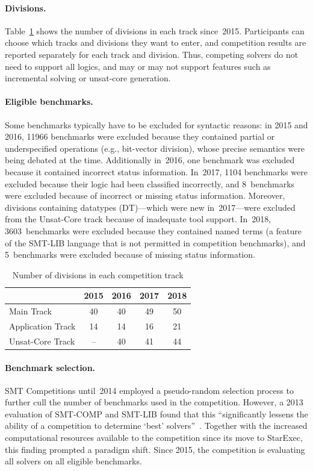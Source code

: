 \documentclass[dvipsnames,table,twoside,11pt]{article}
\newcommand{\maintrack}{Main Track\xspace}
\newcommand{\apptrack}{Application Track\xspace}
\newcommand{\ucoretrack}{Unsat-Core Track\xspace}
\begin{document}
\paragraph{Divisions.}
Table~\ref{table:divisions} shows the number of divisions in each
track since~2015.  Participants can choose which tracks and divisions
they want to enter, and competition results are reported separately
for each track and division.  Thus, competing solvers do not need to support
all logics, and may or may not support features such as incremental solving
or unsat-core generation.

\paragraph{Eligible benchmarks.}
Some benchmarks typically have to be
excluded for syntactic reasons: in 2015 and 2016, \num{11966} benchmarks
were excluded because they contained partial or underspecified
operations (e.g., bit-vector division), whose precise semantics were
being debated at the time.  Additionally in~2016, one benchmark was
excluded because it contained incorrect status information.  In~2017,
\num{1104} benchmarks were excluded because their logic had been classified
incorrectly, and 8~benchmarks were excluded because of incorrect or
missing status information.  Moreover, divisions containing datatypes
({DT})---which were new in~2017---were excluded from the Unsat-Core
track because of inadequate tool support.  In~2018, \num{3603}~benchmarks were
excluded because they contained named terms (a feature of the SMT-LIB
language that is not permitted in competition benchmarks), and
5~benchmarks were excluded because of missing status information.

\begin{table}
  \caption{Number of divisions in each competition track}
  \label{table:divisions}
  \centering
  \begin{tabular}{lcccc}
    \toprule
    & 2015 & 2016 & 2017 & 2018 \\
    \midrule
    \maintrack   &  40 & 40 & 49 & 50 \\
    \apptrack    &  14 & 14 & 16 & 21 \\
    \ucoretrack  &  -- & 40 & 41 & 44 \\
    \bottomrule
  \end{tabular}
\end{table}

\paragraph{Benchmark selection.}
SMT Competitions until~2014 employed a pseudo-random selection process
to further cull the number of benchmarks used in the competition.
However, a 2013 evaluation of SMT-COMP and SMT-LIB found that this
``significantly lessens the ability of a competition to determine
`best' solvers''~\cite{CSW15}. Together with the increased
computational resources available to the competition since its move to
StarExec, this finding prompted a paradigm shift.  Since 2015, the
competition is evaluating all solvers on all eligible benchmarks.
\end{document}
